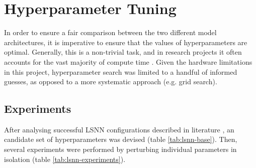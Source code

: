 \documentclass[../../report.tex]{subfiles}
\begin{document}
\section{Hyperparameter Tuning}

In order to ensure a fair comparison between the two different model
architectures, it is imperative to ensure that the values of hyperparameters are
optimal. Generally, this is a non-trivial task, and in research projects it
often accounts for the vast majority of compute time \cite{Strubell2019}. Given
the hardware limitations in this project, hyperparameter search was limited to a
handful of informed guesses, as opposed to a more systematic approach (e.g. grid
search).

\subsection{Experiments}

After analysing successful LSNN configurations described in literature
\cite{Bellec2018LSNN, Bellec2020}, an candidate set of hyperparameters was
devised (table \ref{tab:lsnn-base}). Then, several experiments were performed by
perturbing individual parameters in isolation (table
\ref{tab:lsnn-experiments}).
\end{document}
